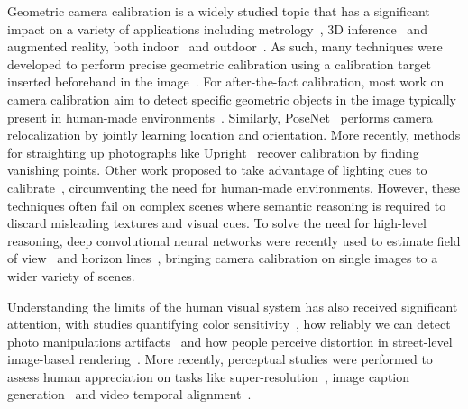 
Geometric camera calibration is a widely studied topic that has a significant impact on a variety of applications including metrology~\cite{Criminisi2000}, 3D inference~\cite{Criminisi00,Fouhey2013} and augmented reality, both indoor~\cite{hedau-iccv-09,izadinia-cvpr-17} and outdoor~\cite{hoiem-cvpr-06}. As such, many techniques were developed to perform precise geometric calibration using a calibration target inserted beforehand in the image~\cite{Sturm1999,Zhang2002,Heikkila1997,Chen2004}. For after-the-fact calibration, most work on camera calibration aim to detect specific geometric objects in the image typically present in human-made environments~\cite{Rother2000,Melo2013}. Similarly, PoseNet~\cite{kendall-iccv-15} performs camera relocalization by jointly learning location and orientation. More recently, methods for straighting up photographs like Upright~\cite{Lee2014} recover calibration by finding vanishing points. Other work proposed to take advantage of lighting cues to calibrate~\cite{lalonde-ijcv-10,Workman2014}, circumventing the need for human-made environments. However, these techniques often fail on complex scenes where semantic reasoning is required to discard misleading textures and visual cues. To solve the need for high-level reasoning, deep convolutional neural networks were recently used to estimate field of view~\cite{Workman2015a} and horizon lines~\cite{Workman2016}, bringing camera calibration on single images to a wider variety of scenes.

Understanding the limits of the human visual system has also received significant attention, with studies quantifying color sensitivity~\cite{fairchild2013color}, how reliably we can detect photo manipulations artifacts~\cite{Farid2010} and how people perceive distortion in street-level image-based rendering~\cite{Vangorp2013}. More recently, perceptual studies were performed to assess human appreciation on tasks like super-resolution~\cite{ledig-cvpr-17}, image caption generation~\cite{vinyals-cvpr-15} and video temporal alignment~\cite{papazoglou-accv-16}. 

